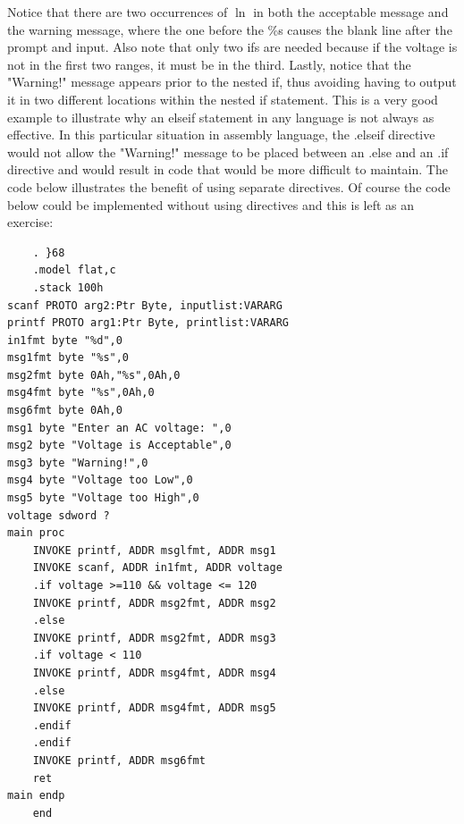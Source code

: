 \documentclass[10pt]{article}
\begin{document}
Notice that there are two occurrences of $\ln$ in both the acceptable message and the warning message, where the one before the \%s causes the blank line after the prompt and input. Also note that only two ifs are needed because if the voltage is not in the first two ranges, it must be in the third. Lastly, notice that the "Warning!" message appears prior to the nested if, thus avoiding having to output it in two different locations within the nested if statement. This is a very good example to illustrate why an elseif statement in any language is not always as effective. In this particular situation in assembly language, the .elseif directive would not allow the "Warning!" message to be placed between an .else and an .if directive and would result in code that would be more difficult to maintain. The code below illustrates the benefit of using separate directives. Of course the code below could be implemented without using directives and this is left as an exercise:

\begin{verbatim}
    . }68
    .model flat,c
    .stack 100h
scanf PROTO arg2:Ptr Byte, inputlist:VARARG
printf PROTO arg1:Ptr Byte, printlist:VARARG
in1fmt byte "%d",0
msg1fmt byte "%s",0
msg2fmt byte 0Ah,"%s",0Ah,0
msg4fmt byte "%s",0Ah,0
msg6fmt byte 0Ah,0
msg1 byte "Enter an AC voltage: ",0
msg2 byte "Voltage is Acceptable",0
msg3 byte "Warning!",0
msg4 byte "Voltage too Low",0
msg5 byte "Voltage too High",0
voltage sdword ?
main proc
    INVOKE printf, ADDR msglfmt, ADDR msg1
    INVOKE scanf, ADDR in1fmt, ADDR voltage
    .if voltage >=110 && voltage <= 120
    INVOKE printf, ADDR msg2fmt, ADDR msg2
    .else
    INVOKE printf, ADDR msg2fmt, ADDR msg3
    .if voltage < 110
    INVOKE printf, ADDR msg4fmt, ADDR msg4
    .else
    INVOKE printf, ADDR msg4fmt, ADDR msg5
    .endif
    .endif
    INVOKE printf, ADDR msg6fmt
    ret
main endp
    end
\end{verbatim}
\end{document}
